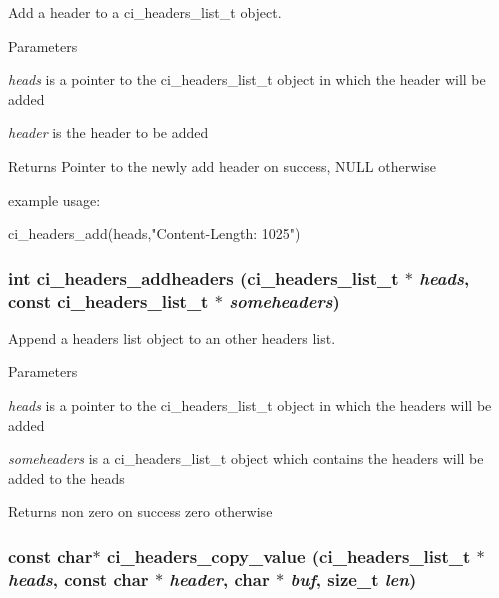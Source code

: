 Add a header to a ci\_\-headers\_\-list\_\-t object. 
\begin{DoxyParams}{Parameters}
\item[{\em heads}]is a pointer to the ci\_\-headers\_\-list\_\-t object in which the header will be added \item[{\em header}]is the header to be added \end{DoxyParams}
\begin{DoxyReturn}{Returns}
Pointer to the newly add header on success, NULL otherwise
\end{DoxyReturn}
example usage: 
\begin{DoxyCode}
  ci_headers_add(heads,"Content-Length: 1025")
\end{DoxyCode}
 \hypertarget{group__HEADERS_ga58800a415a86551d22329c8049390b11}{
\subsubsection[{ci\_\-headers\_\-addheaders}]{\setlength{\rightskip}{0pt plus 5cm}int ci\_\-headers\_\-addheaders ({\bf ci\_\-headers\_\-list\_\-t} $\ast$ {\em heads}, \/  const {\bf ci\_\-headers\_\-list\_\-t} $\ast$ {\em someheaders})}}
\label{group__HEADERS_ga58800a415a86551d22329c8049390b11}


Append a headers list object to an other headers list. 
\begin{DoxyParams}{Parameters}
\item[{\em heads}]is a pointer to the ci\_\-headers\_\-list\_\-t object in which the headers will be added \item[{\em someheaders}]is a ci\_\-headers\_\-list\_\-t object which contains the headers will be added to the heads \end{DoxyParams}
\begin{DoxyReturn}{Returns}
non zero on success zero otherwise 
\end{DoxyReturn}
\hypertarget{group__HEADERS_ga1f67d85d126fbc2a4aacff2fcb05b851}{
\subsubsection[{ci\_\-headers\_\-copy\_\-value}]{\setlength{\rightskip}{0pt plus 5cm}const char$\ast$ ci\_\-headers\_\-copy\_\-value ({\bf ci\_\-headers\_\-list\_\-t} $\ast$ {\em heads}, \/  const char $\ast$ {\em header}, \/  char $\ast$ {\em buf}, \/  size\_\-t {\em len})}}
\label{group__HEADERS_ga1f67d85d126fbc2a4aacff2fcb05b851}



